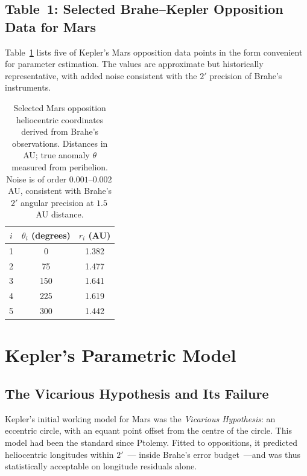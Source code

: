 \documentclass[12pt]{article}
\begin{document}
\subsection{Table~1: Selected Brahe--Kepler Opposition Data for Mars}

Table~\ref{tab:mars_data} lists five of Kepler's Mars opposition data
points in the form convenient for parameter estimation.
The values are approximate but historically representative, with added noise
consistent with the $2'$ precision of Brahe's instruments.

\begin{table}[h]
\centering
\renewcommand{\arraystretch}{1.25}
\caption{Selected Mars opposition heliocentric coordinates derived from
  Brahe's observations.  Distances in AU; true anomaly $\theta$ measured
  from perihelion.  Noise is of order $0.001$--$0.002$\,AU, consistent with
  Brahe's $2'$ angular precision at $1.5$\,AU distance.}
\label{tab:mars_data}
\begin{tabular}{@{}ccc@{}}
\toprule
$i$ & $\theta_{i}$ (degrees) & $r_{i}$ (AU) \\
\midrule
1 &   0  & 1.382 \\
2 &  75  & 1.477 \\
3 & 150  & 1.641 \\
4 & 225  & 1.619 \\
5 & 300  & 1.442 \\
\bottomrule
\end{tabular}
\end{table}

\section{Kepler's Parametric Model}

\subsection{The Vicarious Hypothesis and Its Failure}

Kepler's initial working model for Mars was the \emph{Vicarious Hypothesis}:
an eccentric circle, with an equant point offset from the centre of the
circle.  This model had been the standard since Ptolemy.
Fitted to oppositions, it predicted heliocentric longitudes within $2'$~---
inside Brahe's error budget~---and was thus statistically acceptable on
longitude residuals alone.
\end{document}
